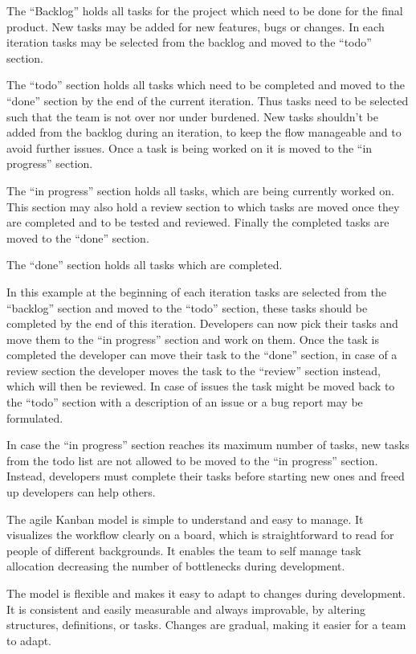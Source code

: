 \documentclass[runningheads]{llncs}
\begin{document}
The “Backlog” holds all tasks for the project which need to be done for the final product. New tasks may be added for new features, 
bugs or changes. In each iteration tasks may be selected from the backlog and moved to the “todo” section.

The “todo” section holds all tasks which need to be completed and moved to the “done” section by the end of the current iteration. 
Thus tasks need to be selected such that the team is not over nor under burdened. New tasks shouldn’t be added from the backlog during 
an iteration, to keep the flow manageable and to avoid further issues. Once a task is being worked on it is moved to the “in progress” section.

The “in progress” section holds all tasks, which are being currently worked on. This section may also hold a review section to which 
tasks are moved once they are completed and to be tested and reviewed. Finally the completed tasks are moved to the “done” section.

The “done” section holds all tasks which are completed.

In this example at the beginning of each iteration tasks are selected from the “backlog” section and moved to the “todo” section, 
these tasks should be completed by the end of this iteration. Developers can now pick their tasks and move them to the “in progress” 
section and work on them. Once the task is completed the developer can move their task to the “done” section, in case of a review section 
the developer moves the task to the “review” section instead, which will then be reviewed. In case of issues the task might be moved back 
to the “todo” section with a description of an issue or a bug report may be formulated.

In case the “in progress” section reaches its maximum number of tasks, new tasks from the todo list are not allowed to be moved to the 
“in progress” section. Instead, developers must complete their tasks before starting new ones and freed up developers can help others. 

The agile Kanban model is simple to understand and easy to manage. It visualizes the workflow clearly on a board, which 
is straightforward to read for people of different backgrounds. It enables the team to self manage task allocation decreasing 
the number of bottlenecks during development.

The model  is flexible and makes it easy to adapt to changes during development. It is consistent and easily measurable and always 
improvable, by altering structures, definitions, or tasks. Changes are gradual, making it easier for a team to adapt.
\end{document}
